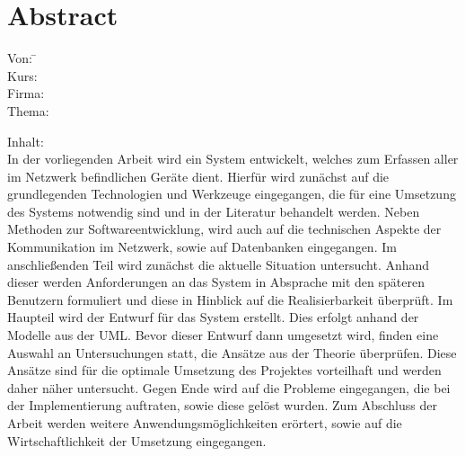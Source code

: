 \section*{Abstract}
\label{sec:Abstract}

\begin{tabbing}
Von:	 \hspace{20mm} \= \autor\\
Kurs:	  \>\kursbez\\
Firma:	  \>\firmenname\\
Thema:	  \>\titel\\
\end{tabbing}

Inhalt:\\
In der vorliegenden Arbeit wird ein System entwickelt, welches zum Erfassen aller im Netzwerk befindlichen Geräte dient.
Hierfür wird zunächst auf die grundlegenden Technologien und Werkzeuge eingegangen, die für eine Umsetzung des Systems notwendig sind und in der Literatur behandelt werden.
Neben Methoden zur Softwareentwicklung, wird auch auf die technischen Aspekte der Kommunikation im Netzwerk, sowie auf Datenbanken eingegangen.
Im anschließenden Teil wird zunächst die aktuelle Situation untersucht. Anhand dieser werden Anforderungen an das System in Absprache mit den späteren Benutzern formuliert und diese in Hinblick auf die Realisierbarkeit überprüft.
Im Haupteil wird der Entwurf für das System erstellt. Dies erfolgt anhand der Modelle aus der UML. Bevor dieser Entwurf dann umgesetzt wird, finden eine Auswahl an Untersuchungen statt, die Ansätze aus der Theorie überprüfen. Diese Ansätze sind für die optimale Umsetzung des Projektes vorteilhaft und werden daher näher untersucht.
Gegen Ende wird auf die Probleme eingegangen, die bei der Implementierung auftraten, sowie diese gelöst wurden. 
Zum Abschluss der Arbeit werden weitere Anwendungsmöglichkeiten erörtert, sowie auf die Wirtschaftlichkeit der Umsetzung eingegangen.